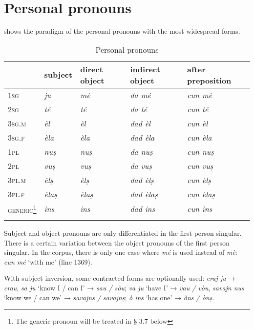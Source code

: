 \section{Personal pronouns}
 shows the paradigm of the personal pronouns with the most widespread forms.

\begin{table}
\caption{Personal pronouns}
\label{tab:perspron}
 \begin{tabular}{lllll}
  \lsptoprule
 &  subject & direct object & indirect object & after preposition\\
  \midrule
\textsc{1sg} & \textit{ju} & \textit{mè} & \textit{da mé} & \textit{cun mè} \\
\textsc{2sg} & \textit{té} & \textit{té} & \textit{da té} & \textit{cun té}\\
\textsc{3sg.m} & \textit{èl} & \textit{èl} & \textit{dad èl} & \textit{cun èl} \\
\textsc{3sg.f} & \textit{èla} & \textit{èla} & \textit{dad èla} & \textit{cun èla}\\
\textsc{1pl} & \textit{nuṣ} & \textit{nuṣ} & \textit{da nuṣ} & \textit{cun nuṣ}\\
\textsc{2pl} & \textit{vuṣ} & \textit{vuṣ} & \textit{da vuṣ} & \textit{cun vuṣ}\\
\textsc{3pl.m} & \textit{èlṣ} & \textit{èlṣ} & \textit{dad èlṣ} & \textit{cun èlṣ}\\
\textsc{3pl.f} & \textit{èlaṣ} & \textit{èlaṣ} & \textit{dad èlaṣ} & \textit{cun èlaṣ}\\
\textsc{generic}\footnote{The generic pronoun will be treated in § 3.7 below} & \textit{ins} & \textit{ins} & \textit{dad ins} & \textit{cun ins}\\
 \lspbottomrule
 \end{tabular}
\end{table}

Subject and object pronouns are only differentiated in the first person singular. There is a certain variation between the object pronouns of the first person singular. In the corpus, there is only one case where \textit{mé} is used instead of \textit{mè}: \textit{cun mé} `with me' (line 1369).

With subject inversion, some contracted forms are optionally used: \textit{craj ju} → \textit{crau}, \textit{sa ju} `know I / can I' → \textit{sau / sòu}; \textit{va ju} `have I' → \textit{vau / vòu}, \textit{savajn nus} `know we / can we' → \textit{savajns / savajnṣ}; \textit{ò ins} `has one' → \textit{òns / ònṣ}.

